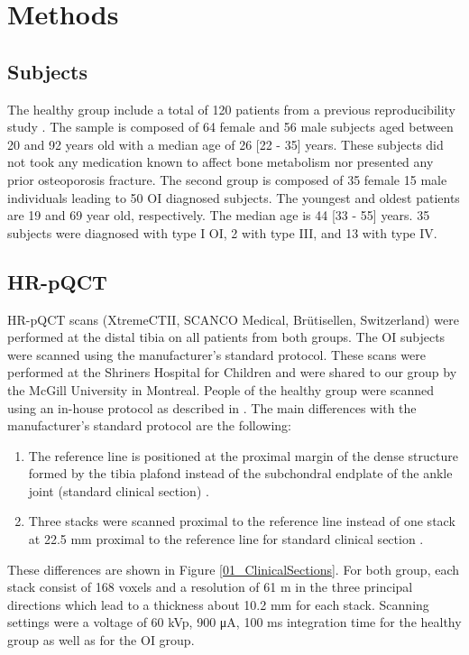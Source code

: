 \documentclass[a4paper,fleqn]{DC_ArtStyle}
\begin{document}
\section{Methods}

\subsection{Subjects}
The healthy group include a total of 120 patients from a previous reproducibility study \cite{Schenk2020}. The sample is composed of 64 female and 56 male subjects aged between 20 and 92 years old with a median age of 26 [22 - 35] years. These subjects did not took any medication known to affect bone metabolism nor presented any prior osteoporosis fracture. The second group is composed of 35 female 15 male individuals leading to 50 OI diagnosed subjects. The youngest and oldest patients are 19 and 69 year old, respectively. The median age is 44 [33 - 55] years. 35 subjects were diagnosed with type I OI, 2 with type III, and 13 with type IV.

\subsection{HR-pQCT}
HR-pQCT scans (XtremeCTII, SCANCO Medical, Brütisellen,
Switzerland) were performed at the distal tibia on all patients from both groups. The OI subjects were scanned using the manufacturer's standard protocol. These scans were performed at the Shriners Hospital for Children and were shared to our group by the McGill University in Montreal. People of the healthy group were scanned using an in-house protocol as described in \cite{Schenk2020}. The main differences with the manufacturer's standard protocol are the following:
\begin{enumerate}
	\item The reference line is positioned at the proximal margin of the dense structure formed by the tibia plafond instead of  the subchondral endplate of the ankle joint (standard clinical section) \cite{Whittier2020}.
	\item Three stacks were scanned proximal to the reference line instead of one stack at 22.5 mm proximal to the reference line for standard clinical section \cite{Whittier2020}.
\end{enumerate}

These differences are shown in Figure \ref{01_ClinicalSections}. For both group, each stack consist of 168 voxels and a resolution of 61 \si{\micro}m in the three principal directions which lead to a thickness about 10.2 mm for each stack. Scanning settings were a voltage of 60 kVp, 900 μA, 100 ms integration time for the healthy group as well as for the OI group.
\end{document}
